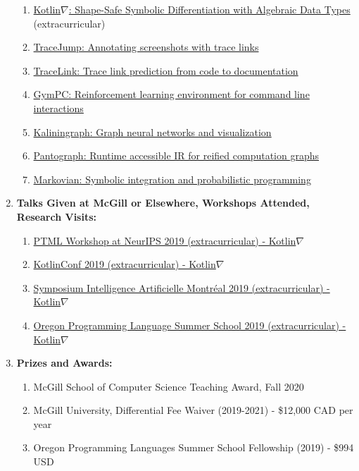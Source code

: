 \documentclass[11pt]{article}
\begin{document}
\begin{enumerate}
        \begin{enumerate}
            \item \href{https://github.com/breandan/kotlingrad}{Kotlin$\nabla$: Shape-Safe Symbolic Differentiation with Algebraic Data Types} (extracurricular)
            \item \href{https://github.com/acejump/tracejump}{TraceJump: Annotating screenshots with trace links}
            \item \href{https://github.com/breandan/tracelink}{TraceLink: Trace link prediction from code to documentation}
            \item \href{https://github.com/breandan/gym-pc}{GymPC: Reinforcement learning environment for command line interactions}
            \item \href{https://github.com/breandan/kaliningraph}{Kaliningraph: Graph neural networks and visualization}
            \item \href{https://github.com/breandan/pantograph}{Pantograph: Runtime accessible IR for reified computation graphs}
            \item \href{https://github.com/breandan/markovian}{Markovian: Symbolic integration and probabilistic programming}
        \end{enumerate}

        \item \textbf{Talks Given at McGill or Elsewhere, Workshops Attended, Research Visits:}

        \begin{enumerate}
            \item \href{https://program-transformations.github.io/}{PTML Workshop at NeurIPS 2019 (extracurricular) - Kotlin$\nabla$}
            \item \href{https://kotlinconf.com/2019/talks/}{KotlinConf 2019 (extracurricular) - Kotlin$\nabla$}
            \item \href{https://montrealaisymposium.wordpress.com/accepted-papers-2019/}{Symposium Intelligence Artificielle Montr\'eal 2019 (extracurricular) - Kotlin$\nabla$}
            \item \href{https://www.cs.uoregon.edu/research/summerschool/summer19/topics.php}{Oregon Programming Language Summer School 2019 (extracurricular) - Kotlin$\nabla$}
        \end{enumerate}

        \item \textbf{Prizes and Awards:}

        \begin{enumerate}
            \item McGill School of Computer Science Teaching Award, Fall 2020
            \item McGill University, Differential Fee Waiver (2019-2021) - \$12,000 CAD per year
            \item Oregon Programming Languages Summer School Fellowship (2019) - \$994 USD
        \end{enumerate}


\end{enumerate}
\end{document}
